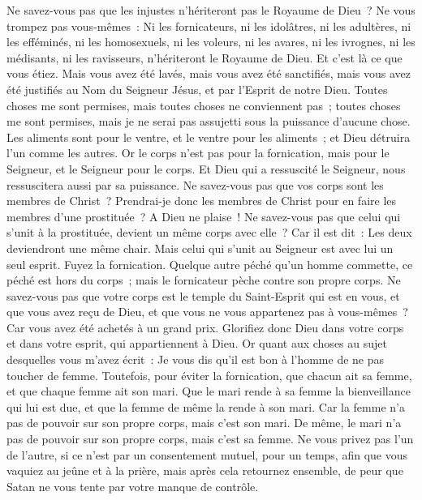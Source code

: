 \begin{multicols}{2}
Ne savez-vous pas que les injustes n'hériteront pas le Royaume de Dieu~? Ne vous trompez pas vous-mêmes~: Ni les fornicateurs, ni les idolâtres, ni les adultères,
ni les efféminés, ni les homosexuels, ni les voleurs, ni les avares, ni les ivrognes, ni les médisants, ni les ravisseurs, n'hériteront le Royaume de Dieu.
Et c'est là ce que vous étiez. Mais vous avez été lavés, mais vous avez été sanctifiés, mais vous avez été justifiés au Nom du Seigneur Jésus, et par l'Esprit de notre Dieu.
Toutes choses me sont permises, mais toutes choses ne conviennent pas~; toutes choses me sont permises, mais je ne serai pas assujetti sous la puissance d'aucune chose. 
Les aliments sont pour le ventre, et le ventre pour les aliments~; et Dieu détruira l'un comme les autres. Or le corps n'est pas pour la fornication, mais pour le Seigneur, et le Seigneur pour le corps.
Et Dieu qui a ressuscité le Seigneur, nous ressuscitera aussi par sa puissance.
Ne savez-vous pas que vos corps sont les membres de Christ~? Prendrai-je donc les membres de Christ pour en faire les membres d'une prostituée~? A Dieu ne plaise~!
Ne savez-vous pas que celui qui s'unit à la prostituée, devient un même corps avec elle~? Car il est dit~: Les deux deviendront une même chair.
Mais celui qui s'unit au Seigneur est avec lui un seul esprit.
Fuyez la fornication. Quelque autre péché qu'un homme commette, ce péché est hors du corps~; mais le fornicateur pèche contre son propre corps.
Ne savez-vous pas que votre corps est le temple du Saint-Esprit qui est en vous, et que vous avez reçu de Dieu, et que vous ne vous appartenez pas à vous-mêmes~?
Car vous avez été achetés à un grand prix. Glorifiez donc Dieu dans votre corps et dans votre esprit, qui appartiennent à Dieu.
\VerseOne{}Or quant aux choses au sujet desquelles vous m'avez écrit~: Je vous dis qu'il est bon à l'homme de ne pas toucher de femme.
Toutefois, pour éviter la fornication, que chacun ait sa femme, et que chaque femme ait son mari.
Que le mari rende à sa femme la bienveillance qui lui est due, et que la femme de même la rende à son mari.
Car la femme n'a pas de pouvoir sur son propre corps, mais c'est son mari. De même, le mari n'a pas de pouvoir sur son propre corps, mais c'est sa femme.
Ne vous privez pas l'un de l'autre, si ce n'est par un consentement mutuel, pour un temps, afin que vous vaquiez au jeûne et à la prière, mais après cela retournez ensemble, de peur que Satan ne vous tente par votre manque de contrôle.

\end{multicols}
